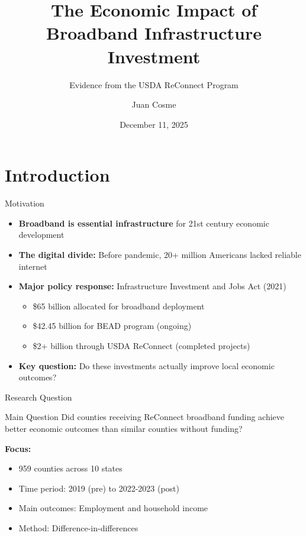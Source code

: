 \documentclass[aspectratio=169]{beamer}
\title[ReConnect Program Impact]{The Economic Impact of Broadband Infrastructure Investment}
\subtitle{Evidence from the USDA ReConnect Program}
\author{Juan Cosme}
\institute{University of South Florida \\ Master of Arts in Economics}
\date{December 11, 2025}
\begin{document}
\begin{frame}
\titlepage
\end{frame}

\section{Introduction}

\begin{frame}{Motivation}
\begin{itemize}
    \item \textbf{Broadband is essential infrastructure} for 21st century economic development
    \item \textbf{The digital divide:} Before pandemic, 20+ million Americans lacked reliable internet
    \item \textbf{Major policy response:} Infrastructure Investment and Jobs Act (2021)
    \begin{itemize}
        \item \$65 billion allocated for broadband deployment
        \item \$42.45 billion for BEAD program (ongoing)
        \item \$2+ billion through USDA ReConnect (completed projects)
    \end{itemize}
    \item \textbf{Key question:} Do these investments actually improve local economic outcomes?
\end{itemize}
\end{frame}

\begin{frame}{Research Question}
\begin{block}{Main Question}
Did counties receiving ReConnect broadband funding achieve better economic outcomes than similar counties without funding?
\end{block}

\vspace{0.5cm}

\textbf{Focus:}
\begin{itemize}
    \item 959 counties across 10 states
    \item Time period: 2019 (pre) to 2022-2023 (post)
    \item Main outcomes: Employment and household income
    \item Method: Difference-in-differences
\end{itemize}
\end{frame}
\end{document}
